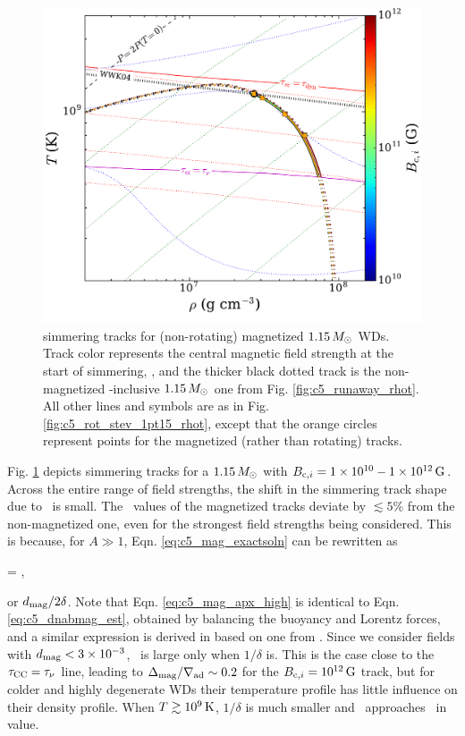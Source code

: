 
\begin{figure}
\centering
\includegraphics[angle=0,width=0.8\columnwidth]{chapter5_zhu+16/figures/mag_1pt15_rhot.pdf}
\caption{simmering tracks for (non-rotating) magnetized $1.15\,\Msun$ WDs.  Track color represents the central magnetic field strength at the start of simmering, \Binit, and the thicker black dotted track is the non-magnetized \dnabconv-inclusive $1.15\,\Msun$ one from Fig. \ref{fig:c5_runaway_rhot}.  All other lines and symbols are as in Fig. \ref{fig:c5_rot_stev_1pt15_rhot}, except that the orange circles represent \citeal{wooswk04} points for the magnetized (rather than rotating) tracks.}
\label{fig:c5_mag_1pt15_rhot}
\end{figure}

Fig. \ref{fig:c5_mag_1pt15_rhot} depicts simmering tracks for a $1.15\,\Msun$ with $\Binit = 1\times10^{10}-1\times10^{12}\,\mrm{G}$.  Across the entire range of field strengths, the shift in the simmering track shape due to \dnabmag\ is small.  The \rhoc\ values of the magnetized tracks deviate by $\lesssim5$\% from the non-magnetized one, even for the strongest field strengths being considered.  This is because, for $A \gg 1$, Eqn. \ref{eq:c5_mag_exactsoln} can be rewritten as

\eqbegin
\dnabmag \approx {} = ,
\label{eq:c5_mag_apx_high}
\eqend

\noindent or $\dmag/2\delta$.  Note that Eqn. \ref{eq:c5_mag_apx_high} is identical to Eqn. \ref{eq:c5_dnabmag_est}, obtained by balancing the buoyancy and Lorentz forces, and a similar expression is derived in \cite{macdm09} based on one from \cite{gougt66}.  Since we consider fields with $\dmag < 3\times10^{-3}$, \dnabmag\ is large only when $1/\delta$ is.  This is the case close to the $\taucc = \taunu$ line, leading to $\dnabmag/\nablaad \sim 0.2$ for the $\Binit = 10^{12}\,\mrm{G}$ track, but for colder and highly degenerate WDs their temperature profile has little influence on their density profile.  When $T\gtrsim10^9\,\mathrm{K}$, $1/\delta$ is much smaller and \dnabmag\ approaches \dnabconv\ in value.

